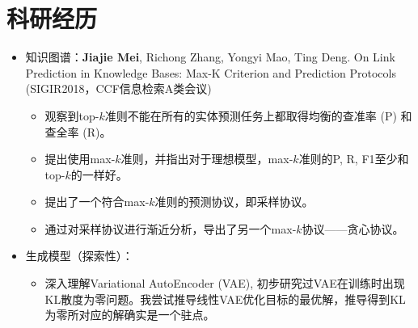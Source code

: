\documentclass{resume}
\begin{document}
\section{科研经历}
\begin{itemize}
	\item 知识图谱：{\bf Jiajie Mei}, Richong Zhang, Yongyi Mao, Ting Deng. On Link Prediction in Knowledge Bases: Max-K Criterion and Prediction Protocols (SIGIR2018，CCF信息检索A类会议)
	\begin{itemize}
		\item 观察到top-$k$准则不能在所有的实体预测任务上都取得均衡的查准率 (P) 和查全率 (R)。
		\item 提出使用max-$k$准则，并指出对于理想模型，max-$k$准则的P, R, F1至少和top-$k$的一样好。
		\item 提出了一个符合max-$k$准则的预测协议，即采样协议。
		\item 通过对采样协议进行渐近分析，导出了另一个max-$k$协议——贪心协议。
	\end{itemize}
\item 生成模型（探索性）：
\begin{itemize}
	\item 深入理解Variational AutoEncoder (VAE), 初步研究过VAE在训练时出现KL散度为零问题。我尝试推导线性VAE优化目标的最优解，推导得到KL为零所对应的解确实是一个驻点。
\end{itemize}


\end{itemize}
\end{document}
